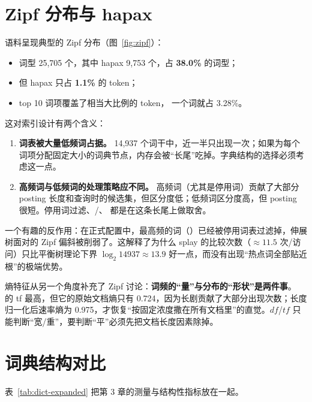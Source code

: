 \section{Zipf 分布与 hapax}

语料呈现典型的 Zipf 分布（图~\ref{fig:zipf}）：

\begin{itemize}
  \item 词型 25,705 个，其中 hapax 9,753 个，占 \textbf{38.0\%} 的词型；
  \item 但 hapax 只占 \textbf{1.1\%} 的 token；
  \item top 10 词项覆盖了相当大比例的 token， 一个词就占 3.28\%。
\end{itemize}

这对索引设计有两个含义：

\begin{enumerate}
  \item \textbf{词表被大量低频词占据。} 14,937 个词干中，近一半只出现一次；如果为每个词项分配固定大小的词典节点，内存会被“长尾”吃掉。字典结构的选择必须考虑这一点。
  \item \textbf{高频词与低频词的处理策略应不同。} 高频词（尤其是停用词）贡献了大部分 posting 长度和查询时的候选集，但区分度低；低频词区分度高，但 posting 很短。停用词过滤、/、 都是在这条长尾上做取舍。
\end{enumerate}

一个有趣的反作用：在正式配置中，最高频的词（）已经被停用词表过滤掉，伸展树面对的 Zipf 偏斜被削弱了。这解释了为什么 splay 的比较次数（$\approx 11.5$ 次/访问）只比平衡树理论下界 $\log_2 14937 \approx 13.9$ 好一点，而没有出现“热点词全部贴近根”的极端优势。

熵特征从另一个角度补充了 Zipf 讨论：\textbf{词频的“量”与分布的“形状”是两件事}。 的 tf 最高，但它的原始文档熵只有 0.724，因为长剧贡献了大部分出现次数；长度归一化后速率熵为 0.975，才恢复“按固定浓度撒在所有文档里”的直觉。$df$/$tf$ 只能判断“宽/重”，要判断“平”必须先把文档长度因素除掉。

\section{词典结构对比}

表~\ref{tab:dict-expanded} 把第 3 章的测量与结构性指标放在一起。

